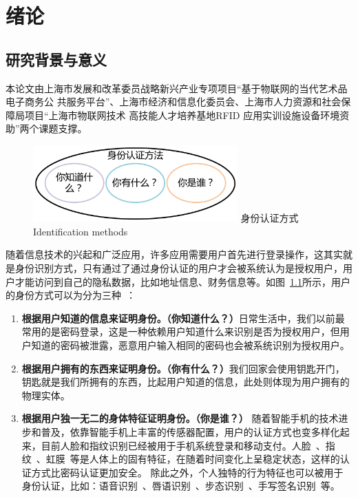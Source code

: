 
\chapter{绪论}
\label{chap:intro}
\section{研究背景与意义}
本论文由上海市发展和改革委员战略新兴产业专项项目“基于物联网的当代艺术品电子商务公
共服务平台”、上海市经济和信息化委员会、上海市人力资源和社会保障局项目“上海市物联网技术
高技能人才培养基地RFID 应用实训设施设备环境资助”两个课题支撑。

\begin{figure}[!htp]
  \centering
  \includegraphics[width=0.7\textwidth]{figure/identification-method.pdf}
  \bicaption
    {身份认证方式}
    {Identification methods}
  \label{fig:identification-method}
\end{figure}
随着信息技术的兴起和广泛应用，许多应用需要用户首先进行登录操作，这其实就是身份识别方式，只有通过了通过身份认证的用户才会被系统认为是授权用户，用户才能访问到自己的隐私数据，比如地址信息、财务信息等。如图~\ref{fig:identification-method}所示，用户的身份方式可以为分为三种~\cite{Huang2011A}：
\begin{enumerate}[label=(\arabic*)]
    \item \textbf{根据用户知道的信息来证明身份。（你知道什么？）}日常生活中，我们以前最常用的是密码登录，这是一种依赖用户知道什么来识别是否为授权用户，但用户知道的密码被泄露，恶意用户输入相同的密码也会被系统识别为授权用户。
    \item \textbf{根据用户拥有的东西来证明身份。（你有什么？）}我们回家会使用钥匙开门，钥匙就是我们所拥有的东西，比起用户知道的信息，此处则体现为用户拥有的物理实体。
    \item \textbf{根据用户独一无二的身体特征证明身份。（你是谁？）} 随着智能手机的技术进步和普及，依靠智能手机上丰富的传感器配置，用户的认证方式也变多样化起来，目前人脸和指纹识别已经被用于手机系统登录和移动支付。人脸~\cite{12717}、指纹~\cite{Andrew2005Handbook}、虹膜~\cite{Wildes1997Iris}等是人体上的固有特征，在随着时间变化上呈稳定状态，这样的认证方式比密码认证更加安全。 除此之外，个人独特的行为特征也可以被用于身份认证，比如：语音识别~\cite{Rashid2008Security}、唇语识别~\cite{Cetingul2006Discriminative}、步态识别~\cite{Boulgouris2005Gait}、手写签名识别~\cite{Plamondona1989Automatic}等。 
\end{enumerate}

